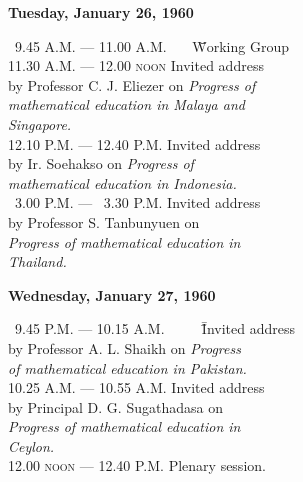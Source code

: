 \eject

\begin{center}
\textbf{Tuesday, January 26, 1960}
\end{center}


\begin{tabbing}
~9.45 A.M. --- 11.00 A.M. ~~~\= \= Working Group\\[0.2cm]
11.30 A.M. --- 12.00 \textsc{noon} \> \> Invited address\\
\> \> by Professor C. J. Eliezer on \textit{Progress of}\\
\> \> \textit{mathematical education in Malaya and}\\
\> \> \textit{Singapore.}\\[0.2cm]
12.10 P.M. --- 12.40 P.M. \> \> Invited address\\
\> \> by Ir. Soehakso on \textit{Progress of}\\
\> \>\textit{mathematical education in Indonesia.}\\[0.2cm]
~3.00 P.M. --- ~3.30 P.M. \> \> Invited address\\
\> \> by Professor S. Tanbunyuen on \\
\> \> \textit{Progress of mathematical education in}\\
\> \> \textit{Thailand.}
\end{tabbing}

\begin{center}
\textbf{Wednesday, January 27, 1960}
\end{center}

\begin{tabbing}
~9.45 P.M. --- 10.15 A.M. ~~~~ \= \= Invited address\\
\> \> by Professor A. L. Shaikh on  \textit{Progress}\\
\> \> \textit{of mathematical education in Pakistan.}\\[0.2cm]
10.25 A.M. --- 10.55 A.M. \> \> Invited address\\
\> \> by Principal D. G. Sugathadasa on \\
\> \> \textit{Progress of mathematical education in}\\
\> \> \textit{Ceylon.}\\[0.2cm]
12.00 \textsc{noon} --- 12.40 P.M. \> \>   Plenary session.
\end{tabbing}








